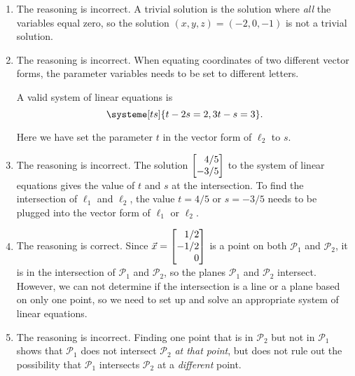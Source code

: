 \begin{exercises}
\begin{problist}
\begin{solution}
\begin{enumerate}
				\item The reasoning is incorrect. A trivial solution is the
				solution where \emph{all} the variables equal zero, so
				the solution $(x, y, z)=(-2, 0, -1)$ is not a trivial
				solution.
				
				\item The reasoning is incorrect. When equating coordinates
				of two different vector forms,
				the parameter variables needs to be set to different
				letters.
				
				A valid system of linear equations is
				\[
					\systeme[ts]{t-2s=2,3t-s=3}.
				\]
				
				Here we have set the parameter $t$ in the vector form of
				$\ell_{2}$ to $s$.
				
				\item The reasoning is incorrect. The solution $\mat{4/5\\-3/5}$
				to the system of linear equations gives the value of $t$ and
				$s$ at the intersection. To find the intersection of $\ell_{1}$
				and $\ell_{2}$, the value $t=4/5$ or $s=-3/5$ needs to be
				plugged into the vector form of $\ell_{1}$ or $\ell_{2}$.
				
				\item The reasoning is correct. Since
				$\vec x=\mat{1/2\\-1/2\\0}$ is a point on both
				$\mathcal{P}_{1}$ and $\mathcal{P}_{2}$, it is in the intersection
				of $\mathcal{P}_{1}$ and $\mathcal{P}_{2}$, so the planes
				$\mathcal{P}_{1}$ and $\mathcal{P}_{2}$ intersect. However,
				we can not determine if the intersection is a line or a
				plane based on only one point, so we need to set up and solve
				an appropriate system of linear equations.
				
				\item The reasoning is incorrect. 
				Finding one point that is in $\mathcal{P}_{2}$ but not in $\mathcal{P}_{1}$ 
				shows that $\mathcal P_1$ does not intersect $\mathcal P_2$ \emph{at that point}, but
				does not rule out the possibility that $\mathcal P_1$ intersects $\mathcal P_2$
				at a \emph{different} point.
			\end{enumerate}
		\end{solution}
	\end{problist}
\end{exercises}
